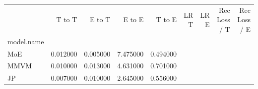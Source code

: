 \begin{tabular}{lrrrrrrrr}
\toprule
 & T to T & E to T & E to E & T to E & LR T & LR E & Rec Loss / T & Rec Loss / E \\
model.name &  &  &  &  &  &  &  &  \\
\midrule

MoE & 0.012000 & 0.005000 & 7.475000 & 0.494000 \\
MMVM  & 0.010000 & 0.013000 & 4.631000 & 0.701000 \\
JP  & 0.007000 & 0.010000 & 2.645000 & 0.556000 \\
\bottomrule
\end{tabular}
